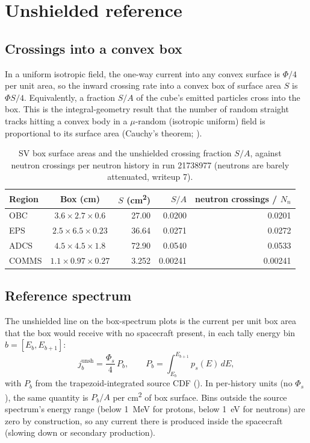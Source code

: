 \section{Unshielded reference}

\subsection{Crossings into a convex box}
In a uniform isotropic field, the one-way current into any convex surface is $\Phi/4$ per unit area, so the inward crossing rate into a convex box of surface area $S$ is $\Phi S/4$. Equivalently, a fraction $S/A$ of the cube's emitted particles cross into the box. This is the integral-geometry result that the number of random straight tracks hitting a convex body in a $\mu$-random (isotropic uniform) field is proportional to its surface area (Cauchy's theorem; \citet{kellerer1971}).

\begin{table}[h]
\centering
\caption{SV box surface areas and the unshielded crossing fraction $S/A$, against neutron crossings per neutron history in run 21738977 (neutrons are barely attenuated, writeup 7).}
\label{tab:boxes}
\begin{tabular}{lcrrr}
\toprule
Region & Box (cm) & $S$ (\si{cm^2}) & $S/A$ & \mcdc{} neutron crossings / $N_n$ \\
\midrule
OBC   & $3.6\times2.7\times0.6$   & 27.00 & 0.0200 & 0.0201 \\
EPS   & $2.5\times6.5\times0.23$  & 36.64 & 0.0271 & 0.0272 \\
ADCS  & $4.5\times4.5\times1.8$   & 72.90 & 0.0540 & 0.0533 \\
COMMS & $1.1\times0.97\times0.27$ & 3.252 & 0.00241 & 0.00241 \\
\bottomrule
\end{tabular}
\end{table}

\subsection{Reference spectrum}
The unshielded line on the box-spectrum plots is the current per unit box area that the box would receive with no spacecraft present, in each tally energy bin $b=[E_b,E_{b+1}]$:
\begin{equation}
  j_b^{\text{unsh}} = \frac{\Phi_s}{4}\,P_b,\qquad P_b = \int_{E_b}^{E_{b+1}} p_s(E)\,dE,
\end{equation}
with $P_b$ from the trapezoid-integrated source CDF (). In per-history units (no $\Phi_s$), the same quantity is $P_b/A$ per \si{cm^2} of box surface. Bins outside the source spectrum's energy range (below \SI{1}{MeV} for protons, below \SI{1}{eV} for neutrons) are zero by construction, so any current there is produced inside the spacecraft (slowing down or secondary production).

